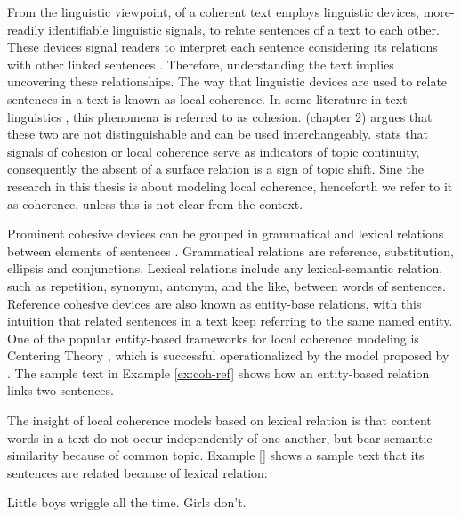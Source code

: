 From the linguistic viewpoint, of a coherent text employs linguistic devices, more-readily identifiable linguistic signals, to relate sentences of a text to each other. 
These devices signal readers to interpret each sentence considering its relations with other linked sentences \cite{vandijk77}. 
Therefore, understanding the text implies uncovering these relationships.  
The way that linguistic devices are used to relate sentences in a text is known as local coherence. 
In some literature in text linguistics \cite{halliday76}, this phenomena is referred to as cohesion.   
 (chapter 2) argues that these two are not distinguishable and can be used interchangeably. 
 stats that signals of cohesion or local coherence serve as indicators of topic continuity, consequently the absent of a surface relation is a sign of topic shift. 
Sine the research in this thesis is about modeling local coherence, henceforth we refer to it as coherence, unless this is not clear from the context. 

Prominent cohesive devices can be grouped in grammatical and lexical relations between elements of sentences \cite{halliday76}. 
Grammatical relations are reference, substitution, ellipsis and conjunctions. 
Lexical relations include any lexical-semantic relation, such as repetition, synonym, antonym, and the like, between words of sentences. 
Reference cohesive devices are also known as entity-base relations, with this intuition that related sentences in a text keep referring to the same named entity. 
One of the popular entity-based frameworks for local coherence modeling is Centering Theory \cite{grosz95}, which is successful operationalized by the model proposed by . 
The sample text in Example \ref{ex:coh-ref} shows how an entity-based relation links two sentences. 

\begin{examples}
	\label{ex:coh-ref}

\end{examples}

The insight of local coherence models based on lexical relation is that content words in a text do not occur independently of one another, but bear semantic similarity because of common topic. 
Example \ref{} shows a sample text that its sentences are related because of lexical relation: 

\begin{examples}
	\label{ex:coh-lex}
	Little boys wriggle all the time. Girls don't. 
\end{examples} 

